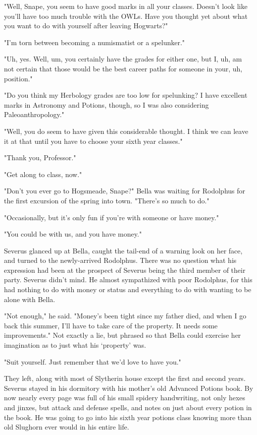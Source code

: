 "Well, Snape, you seem to have good marks in all your classes. Doesn't look like you'll have too much trouble with the OWLs. Have you thought yet about what you want to do with yourself after leaving Hogwarts?"

"I'm torn between becoming a numismatist or a spelunker."

"Uh, yes. Well, um, you certainly have the grades for either one, but I, uh, am not certain that those would be the best career paths for someone in your, uh, position."

"Do you think my Herbology grades are too low for spelunking? I have excellent marks in Astronomy and Potions, though, so I was also considering Paleoanthropology."

"Well, you do seem to have given this considerable thought. I think we can leave it at that until you have to choose your sixth year classes."

"Thank you, Professor."

"Get along to class, now."

"Don't you ever go to Hogsmeade, Snape?" Bella was waiting for Rodolphus for the first excursion of the spring into town. "There's so much to do."

"Occasionally, but it's only fun if you're with someone or have money."

"You could be with us, and you have money."

Severus glanced up at Bella, caught the tail-end of a warning look on her face, and turned to the newly-arrived Rodolphus. There was no question what his expression had been at the prospect of Severus being the third member of their party. Severus didn't mind. He almost sympathized with poor Rodolphus, for this had nothing to do with money or status and everything to do with wanting to be alone with Bella.

"Not enough," he said. "Money's been tight since my father died, and when I go back this summer, I'll have to take care of the property. It needs some improvements." Not exactly a lie, but phrased so that Bella could exercise her imagination as to just what his `property' was.

"Suit yourself. Just remember that we'd love to have you."

They left, along with most of Slytherin house except the first and second years. Severus stayed in his dormitory with his mother's old Advanced Potions book. By now nearly every page was full of his small spidery handwriting, not only hexes and jinxes, but attack and defense spells, and notes on just about every potion in the book. He was going to go into his sixth year potions class knowing more than old Slughorn ever would in his entire life.

